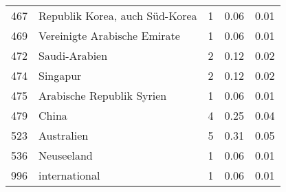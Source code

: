 \begin{longtable}{lXrrr}
        467 & \multicolumn{1}{X}{Republik Korea, auch Süd-Korea} & %
          \num{1} &
          \num[round-mode=places,round-precision=2]{0.06} &
          \num[round-mode=places,round-precision=2]{0.01} \\

        469 & \multicolumn{1}{X}{Vereinigte Arabische Emirate} & %
          \num{1} &
          \num[round-mode=places,round-precision=2]{0.06} &
          \num[round-mode=places,round-precision=2]{0.01} \\

        472 & \multicolumn{1}{X}{Saudi-Arabien} & %
          \num{2} &
          \num[round-mode=places,round-precision=2]{0.12} &
          \num[round-mode=places,round-precision=2]{0.02} \\

        474 & \multicolumn{1}{X}{Singapur} & %
          \num{2} &
          \num[round-mode=places,round-precision=2]{0.12} &
          \num[round-mode=places,round-precision=2]{0.02} \\

        475 & \multicolumn{1}{X}{Arabische Republik Syrien} & %
          \num{1} &
          \num[round-mode=places,round-precision=2]{0.06} &
          \num[round-mode=places,round-precision=2]{0.01} \\

        479 & \multicolumn{1}{X}{China} & %
          \num{4} &
          \num[round-mode=places,round-precision=2]{0.25} &
          \num[round-mode=places,round-precision=2]{0.04} \\

        523 & \multicolumn{1}{X}{Australien} & %
          \num{5} &
          \num[round-mode=places,round-precision=2]{0.31} &
          \num[round-mode=places,round-precision=2]{0.05} \\

        536 & \multicolumn{1}{X}{Neuseeland} & %
          \num{1} &
          \num[round-mode=places,round-precision=2]{0.06} &
          \num[round-mode=places,round-precision=2]{0.01} \\

        996 & \multicolumn{1}{X}{international} & %
          \num{1} &
          \num[round-mode=places,round-precision=2]{0.06} &
          \num[round-mode=places,round-precision=2]{0.01} \\


\end{longtable}
